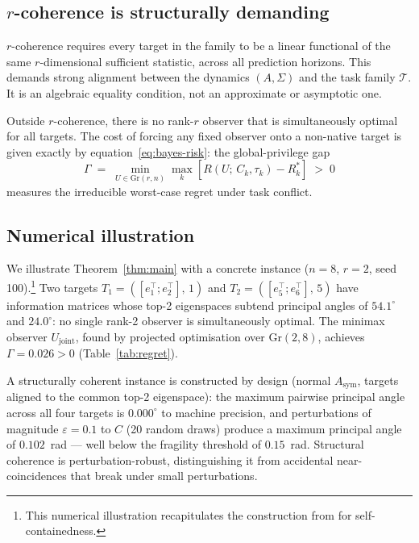 \documentclass[11pt]{article}
\begin{document}
\subsection{$r$-coherence is structurally demanding}

$r$-coherence requires every target in the family to be a linear functional
of the same $r$-dimensional sufficient statistic, across all prediction
horizons.
This demands strong alignment between the dynamics $(A, \Sigma)$ and the
task family $\mathcal{T}$.
It is an algebraic equality condition, not an approximate or asymptotic one.

Outside $r$-coherence, there is no rank-$r$ observer that is simultaneously
optimal for all targets.
The cost of forcing any fixed observer onto a non-native target is given
exactly by equation~\eqref{eq:bayes-risk}:
the global-privilege gap
\begin{equation}
    \Gamma
    \;=\;
    \min_{U \in \mathrm{Gr}(r,n)}
    \max_k \left[ R(U;\, C_k,\tau_k) - R^*_k \right]
    \;>\; 0
\end{equation}
measures the irreducible worst-case regret under task conflict.

\subsection{Numerical illustration}

We illustrate Theorem~\ref{thm:main} with a concrete instance
($n = 8$, $r = 2$, seed 100).\footnote{This numerical illustration
recapitulates the construction from \citet{bhatia2026lgds} for
self-containedness.}
Two targets $T_1 = ([e_1^\top; e_2^\top],\, 1)$ and
$T_2 = ([e_5^\top; e_6^\top],\, 5)$ have information matrices whose top-2
eigenspaces subtend principal angles of $54.1^\circ$ and $24.0^\circ$:
no single rank-2 observer is simultaneously optimal.
The minimax observer $U_{\mathrm{joint}}$, found by projected optimisation
over $\mathrm{Gr}(2,8)$, achieves $\Gamma = 0.026 > 0$
(Table~\ref{tab:regret}).

A structurally coherent instance is constructed by design
(normal $A_{\mathrm{sym}}$, targets aligned to the common top-2 eigenspace):
the maximum pairwise principal angle across all four targets is
$0.000^\circ$ to machine precision,
and perturbations of magnitude $\varepsilon = 0.1$ to $C$
(20 random draws) produce a maximum principal angle of $0.102$~rad ---
well below the fragility threshold of $0.15$~rad.
Structural coherence is perturbation-robust,
distinguishing it from accidental near-coincidences that break under
small perturbations.
\end{document}
